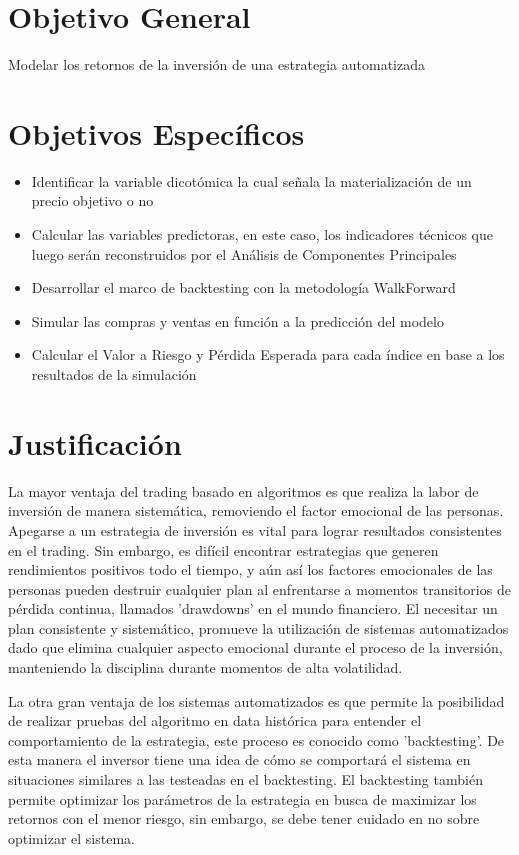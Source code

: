\documentclass[a4paper,12pt]{Latex/Classes/PhDthesisPSnPDF}
\begin{document}
\section{Objetivo General}

Modelar los retornos de la inversión de una estrategia automatizada

\section{Objetivos Específicos}

\begin{itemize}
\item Identificar la variable dicotómica la cual señala la materialización de un precio objetivo o no
\item Calcular las variables predictoras, en este caso, los indicadores técnicos que luego serán reconstruidos por el Análisis de Componentes Principales
\item Desarrollar el marco de backtesting con la metodología WalkForward
\item Simular las compras y ventas en función a la predicción del modelo 
\item Calcular el Valor a Riesgo y Pérdida Esperada para cada índice en base a los resultados de la simulación
\end{itemize}

\section{Justificación}

La mayor ventaja del trading basado en algoritmos es que realiza la labor de inversión de manera sistemática, removiendo el factor emocional de las personas. Apegarse a un estrategia de inversión es vital para lograr resultados consistentes en el trading. Sin embargo, es difícil encontrar estrategias que generen rendimientos positivos todo el tiempo, y aún así los factores emocionales de las personas pueden destruir cualquier plan al enfrentarse a momentos transitorios de pérdida continua, llamados 'drawdowns' en el mundo financiero. El necesitar un plan consistente y sistemático, promueve la utilización de sistemas automatizados dado que elimina cualquier aspecto emocional durante el proceso de la inversión, manteniendo la disciplina durante momentos de alta volatilidad.

La otra gran ventaja de los sistemas automatizados es que permite la posibilidad de realizar pruebas del algoritmo en data histórica para entender el comportamiento de la estrategia, este proceso es conocido como 'backtesting'. De esta manera el inversor tiene una idea de cómo se comportará el sistema en situaciones similares a las testeadas en el backtesting. El backtesting también permite optimizar los parámetros de la estrategia en busca de maximizar los retornos con el menor riesgo, sin embargo, se debe tener cuidado en no sobre optimizar el sistema. 
\end{document}
